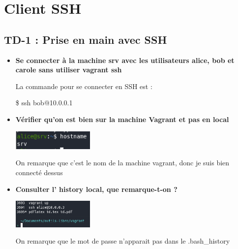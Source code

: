 \documentclass[12pt]{article}
\begin{document}
  \section{Client SSH}

    \subsection{TD-1 : Prise en main avec SSH}
    \vspace{0.3cm}

\begin{itemize}
  \item \textbf{Se connecter à la machine srv avec les utilisateurs alice, bob et carole sans utiliser vagrant ssh}
  \vspace{0.3cm}

  La commande pour se connecter en SSH est : \newline

  \$ ssh bob@10.0.0.1

\end{itemize}
\vspace{0.3cm}

\begin{itemize}
  \item \textbf{Vérifier qu'on est bien sur la machine Vagrant et pas en local}
  \vspace{0.3cm}

  \includegraphics[width=4cm]{images/screen-ssh-td1.png}
  \vspace{0.3cm}

  On remarque que c'est le nom de la machine vagrant, donc je suis bien connecté dessus

\end{itemize}
\vspace{0.3cm}

\begin{itemize}
  \item \textbf{Consulter l' history local, que remarque-t-on ?}
  \vspace{0.3cm}

  \includegraphics[width=4cm]{images/screen-ssh-td1-2.png}
  \vspace{0.3cm}

  On remarque que le mot de passe n'apparait pas dans le .bash\_history
\end{itemize}
\vspace{0.3cm}
\end{document}
